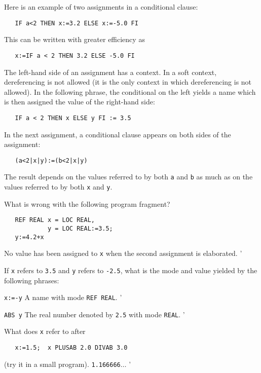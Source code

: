Here is an example of two assignments in a conditional clause:
\begin{verbatim}
   IF a<2 THEN x:=3.2 ELSE x:=-5.0 FI
\end{verbatim}
\noindent
This can be written with greater efficiency as
\begin{verbatim}
   x:=IF a < 2 THEN 3.2 ELSE -5.0 FI
\end{verbatim}

The left-hand side of an assignment has a
 context. In a soft context,
dereferencing is not allowed (it is the only context in which
dereferencing is not allowed). In the following phrase, the
conditional  on the left yields a
name which is then assigned the value of the right-hand side:
\begin{verbatim}
   IF a < 2 THEN x ELSE y FI := 3.5
\end{verbatim}
\noindent
In the next assignment, a conditional clause appears on both sides of the
assignment:
\begin{verbatim}
   (a<2|x|y):=(b<2|x|y)
\end{verbatim}
\noindent
The result depends on the values referred to by both \verb|a| and
\verb|b| as much as on the values referred to by both \verb|x| and
\verb|y|.

\begin{exercise}
\item What is wrong with the following program fragment?
\begin{verbatim}
   REF REAL x = LOC REAL,
            y = LOC REAL:=3.5;
   y:=4.2+x
\end{verbatim}
\indent\ans No value has been assigned to \verb|x| when the second
assignment is elaborated.
'
\item If \verb|x| refers to \verb|3.5| and \verb|y| refers to
\verb|-2.5|, what is the mode and value yielded by the following
phrases:
\begin{subex}
\item \verb|x:=-y| \subans A name with mode \verb|REF REAL|.
'
\item \verb|ABS y| \subans The real number denoted by \verb|2.5| with
mode \verb|REAL|.
'
\end{subex}
\item What does \verb|x| refer to after
\begin{verbatim}
   x:=1.5;  x PLUSAB 2.0 DIVAB 3.0
\end{verbatim}
\noindent
(try it in a small program). \ans \verb|1.166666|$\ldots$
'
\end{exercise}

